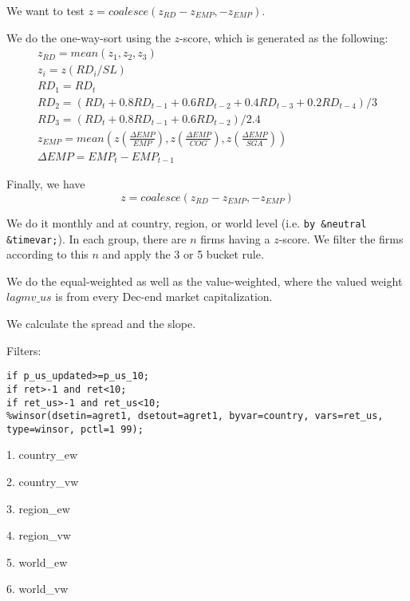 





\thispagestyle{fancy}

\newcommand{\code}{\texttt}
\newcommand*{\Commonpath}{20181224/zEMP/SL}

We want to test $z = coalesce(z_{RD}-z_{EMP}, -z_{EMP})$.

We do the one-way-sort using the $z$-score, which is generated as the following:
$$
\begin{aligned}
& z_{RD} = mean(z_1, z_2, z_3) \\
& z_i = z(RD_i/SL) \\
& RD_1 = RD_t \\
& RD_2 = (RD_t + 0.8RD_{t-1} + 0.6RD_{t-2} + 0.4RD_{t-3} + 0.2RD_{t-4})/3 \\
& RD_3 = (RD_t + 0.8RD_{t-1} + 0.6RD_{t-2})/2.4 
& \\
& z_{EMP} = mean(z(\frac{\Delta EMP}{EMP}), z(\frac{\Delta EMP}{COG}), z(\frac{\Delta EMP}{SGA})) \\
& \Delta EMP = EMP_t - EMP_{t-1}
\end{aligned}
$$

Finally, we have
$$
z = coalesce(z_{RD}-z_{EMP}, -z_{EMP})
$$


We do it monthly and at country, region, or world level (i.e. \code{by \&neutral \&timevar;}). In each group, there are $n$ firms having a $z$-score. We filter the firms according to this $n$ and apply the 3 or 5 bucket rule.

We do the equal-weighted as well as the value-weighted, where the valued weight $lagmv\_us$ is from every Dec-end market capitalization.

We calculate the spread and the slope.

Filters:

\code{if p\_us\_updated>=p\_us\_10;} \\
\code{if ret>-1 and ret<10;} \\
\code{if ret\_us>-1 and ret\_us<10;} \\
\code{\%winsor(dsetin=agret1, dsetout=agret1, byvar=country, vars=ret\_us, type=winsor, pctl=1 99);}


1. country\_ew


2. country\_vw


3. region\_ew


4. region\_vw


5. world\_ew


6. world\_vw



